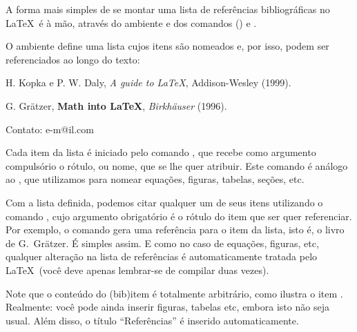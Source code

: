 \documentclass[a4paper,12pt]{article}
\begin{document}
	A forma mais simples de se montar uma lista de referências bibliográficas
no \LaTeX\ é à mão, através do ambiente  e dos
comandos  () e .

	O ambiente  define uma lista cujos itens são
nomeados e, por isso, podem ser referenciados ao longo do texto:
		
	\begin{thebibliography}{-}
	
	    H. Kopka e P. W. Daly,      %
	    \textsl{A guide to \LaTeX}, %
	    Addison-Wesley              %
	    (1999).                     %
	    
	   	G. Grätzer,                 %
	   	\textbf{Math into \LaTeX},  %
	   	\textit{Birkhäuser}         %
	   	(1996).                     %
	   	
			Contato: e-m@il.com
			
	\end{thebibliography}

	Cada item da lista  é iniciado pelo comando
, que recebe como argumento compulsório o rótulo, ou nome,
que se lhe quer atribuir. Este comando é análogo ao , que
utilizamos para nomear equações, figuras, tabelas, seções, etc.

	Com a lista definida, podemos citar qualquer um de seus itens utilizando
o comando , cujo argumento obrigatório é o rótulo do item
que ser quer referenciar. Por exemplo, o comando  gera
uma referência para o item \cite{Gratzer:1996} da lista, isto é, o livro de
G.~Grätzer. É simples assim. E como no caso de equações, figuras, etc, qualquer
alteração na lista de referências é automaticamente tratada pelo \LaTeX\ (você
deve apenas lembrar-se de compilar duas vezes).
	
	
	Note que o conteúdo do (bib)item é totalmente arbitrário, como ilustra o
item \cite{e-mail}. Realmente: você pode ainda inserir figuras, tabelas
etc, embora isto não seja usual. Além disso, o título ``Referências'' é
inserido automaticamente.
\end{document}
